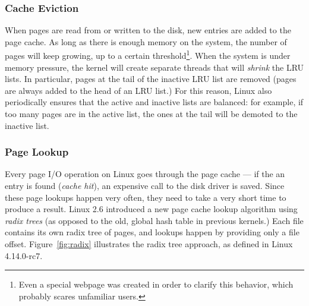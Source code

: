 \subsubsection{Cache Eviction}

When pages are read from or written to the disk, new entries are added to the
page cache.  As long as there is enough memory on the system, the number of
pages will keep growing, up to a certain threshold\footnote{Even a special
webpage was \cite{lamr} created in order to clarify this behavior, which
probably scares unfamiliar users.}. When the system is under memory pressure,
the kernel will create separate threads that will \emph{shrink} the LRU lists.
In particular, pages at the tail of the inactive LRU list are removed (pages
are always added to the head of an LRU list.) For this reason, Linux also
periodically ensures that the active and inactive lists are balanced: for
example, if too many pages are in the active list, the ones at the tail will be
demoted to the inactive list.

\subsubsection{Page Lookup}

Every page I/O operation on Linux goes through the page cache --- if the an
entry is found (\emph{cache hit}), an expensive call to the disk driver is
saved. Since these page lookups happen very often, they need to take a very
short time to produce a result. Linux 2.6 introduced a new page cache lookup
algorithm using \emph{radix trees} (as opposed to the old, global hash table in
previous kernels.) Each file contains its own radix tree of pages, and lookups
happen by providing only a file offset. Figure~\ref{fig:radix} illustrates the
radix tree approach, as defined in Linux 4.14.0-rc7.

